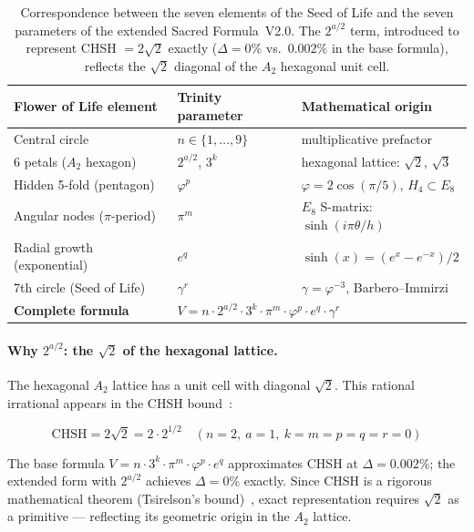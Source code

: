 \documentclass[10pt,a4paper]{article}
\begin{document}
\begin{table}[ht]
\centering
\small
\begin{tabular}{lll}
\toprule
\textbf{Flower of Life element} & \textbf{Trinity parameter} &
\textbf{Mathematical origin} \\
\midrule
Central circle            & $n \in \{1,\ldots,9\}$ & multiplicative prefactor \\
6 petals ($A_2$ hexagon)  & $2^{a/2}$, $3^k$       & hexagonal lattice: $\sqrt{2}$, $\sqrt{3}$ \\
Hidden 5-fold (pentagon)  & $\varphi^p$            & $\varphi = 2\cos(\pi/5)$, $H_4 \subset E_8$ \\
Angular nodes ($\pi$-period) & $\pi^m$             & $E_8$ S-matrix: $\sinh(i\pi\theta/h)$ \\
Radial growth (exponential) & $e^q$               & $\sinh(x) = (e^x - e^{-x})/2$ \\
7th circle (Seed of Life) & $\gamma^r$             & $\gamma = \varphi^{-3}$, Barbero--Immirzi \\
\midrule
\textbf{Complete formula} &
\multicolumn{2}{l}{$V = n \cdot 2^{a/2} \cdot 3^k \cdot \pi^m \cdot
                        \varphi^p \cdot e^q \cdot \gamma^r$} \\
\bottomrule
\end{tabular}
\caption{Correspondence between the seven elements of the Seed of Life and
the seven parameters of the extended Sacred Formula~V2.0. The
$2^{a/2}$ term, introduced to represent CHSH $= 2\sqrt{2}$ exactly
($\Delta = 0\%$ vs.\ $0.002\%$ in the base formula), reflects the $\sqrt{2}$
diagonal of the $A_2$ hexagonal unit cell.}
\label{tab:flower_trinity}
\end{table}

\paragraph{Why $2^{a/2}$: the $\sqrt{2}$ of the hexagonal lattice.}
The hexagonal $A_2$ lattice has a unit cell with diagonal $\sqrt{2}$. This rational irrational appears in the CHSH bound~\cite{tsirelson1980}:

\begin{equation}
  \mathrm{CHSH} = 2\sqrt{2} = 2 \cdot 2^{1/2}
  \quad (n=2,\ a=1,\ k=m=p=q=r=0)
  \label{eq:chsh_exact}
\end{equation}

The base formula $V = n \cdot 3^k \cdot \pi^m \cdot \varphi^p \cdot e^q$
approximates CHSH at $\Delta = 0.002\%$; the extended form with $2^{a/2}$
achieves $\Delta = 0\%$ exactly. Since CHSH is a rigorous mathematical theorem
(Tsirelson's bound)~\cite{tsirelson1980}, exact representation requires $\sqrt{2}$
as a primitive --- reflecting its geometric origin in the $A_2$ lattice.
\end{document}
